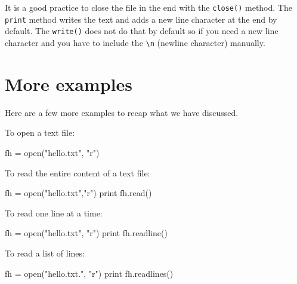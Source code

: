 \documentclass[
  letterpaper,
]{scrbook}
\newenvironment{Shaded}{\begin{snugshade}}{\end{snugshade}}
\newcommand{\BuiltInTok}[1]{\textcolor[rgb]{0.00,0.23,0.31}{#1}}
\newcommand{\NormalTok}[1]{\textcolor[rgb]{0.00,0.23,0.31}{#1}}
\newcommand{\OperatorTok}[1]{\textcolor[rgb]{0.37,0.37,0.37}{#1}}
\newcommand{\StringTok}[1]{\textcolor[rgb]{0.13,0.47,0.30}{#1}}
\begin{document}
It is a good practice to close the file in the end with the
\texttt{close()} method. The \texttt{print} method writes the text and
adds a new line character at the end by default. The \texttt{write()}
does not do that by default so if you need a new line character and you
have to include the \texttt{\textbackslash{}n} (newline character)
manually.

\section*{More examples}\label{more-examples}


Here are a few more examples to recap what we have discussed.

To open a text file:

\begin{Shaded}
\begin{Highlighting}[]
\NormalTok{fh }\OperatorTok{=} \BuiltInTok{open}\NormalTok{(}\StringTok{"hello.txt"}\NormalTok{, }\StringTok{"r"}\NormalTok{)}
\end{Highlighting}
\end{Shaded}

To read the entire content of a text file:

\begin{Shaded}
\begin{Highlighting}[]
\NormalTok{fh }\OperatorTok{=} \BuiltInTok{open}\NormalTok{(}\StringTok{"hello.txt"}\NormalTok{,}\StringTok{"r"}\NormalTok{)}
\BuiltInTok{print}\NormalTok{ fh.read()}
\end{Highlighting}
\end{Shaded}

To read one line at a time:

\begin{Shaded}
\begin{Highlighting}[]
\NormalTok{fh }\OperatorTok{=} \BuiltInTok{open}\NormalTok{(}\StringTok{"hello.txt"}\NormalTok{, }\StringTok{"r"}\NormalTok{)}
\BuiltInTok{print}\NormalTok{ fh.readline()}
\end{Highlighting}
\end{Shaded}

To read a list of lines:

\begin{Shaded}
\begin{Highlighting}[]
\NormalTok{fh }\OperatorTok{=} \BuiltInTok{open}\NormalTok{(}\StringTok{"hello.txt."}\NormalTok{, }\StringTok{"r"}\NormalTok{)}
\BuiltInTok{print}\NormalTok{ fh.readlines()}
\end{Highlighting}
\end{Shaded}
\end{document}

